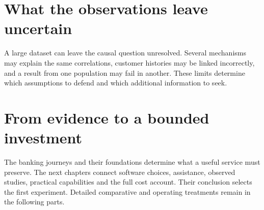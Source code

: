 \documentclass[11pt,a4paper,openany]{book}
\begin{document}
\part{What the observations leave uncertain}
\label{reading:part-uncertainty}
A large dataset can leave the causal question unresolved. Several mechanisms
may explain the same correlations, customer histories may be linked incorrectly,
and a result from one population may fail in another. These limits determine
which assumptions to defend and which additional information to seek.






\part{From evidence to a bounded investment}
\label{rewrite:part-synthesis}
The banking journeys and their foundations determine what a useful service
must preserve. The next chapters connect software choices, assistance,
observed studies, practical capabilities and the full cost account. Their
conclusion selects the first experiment. Detailed comparative and operating
treatments remain in the following parts.

















\end{document}
